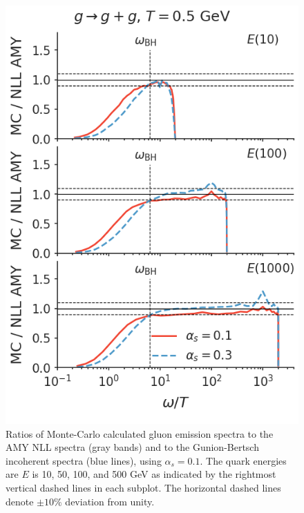 \documentclass[aps, prc, reprint, amsmath, groupedaddress, nofootinbib]{revtex4-1}
\begin{document}
\begin{appendices}
\begin{figure}
\includegraphics[width=\columnwidth]{spectrum_E_g2gg.png}
\caption{Ratios of Monte-Carlo calculated gluon emission spectra to the AMY NLL spectra (gray bands) and to the Gunion-Bertsch incoherent spectra (blue lines), using $\alpha_s = 0.1$. The quark energies are $E$ is 10, 50, 100, and 500 GeV as indicated by the rightmost vertical dashed lines in each subplot. The horizontal dashed lines denote $\pm 10\%$ deviation from unity.}
\label{fig:spectra-alphas=0.1}
\end{figure}


\end{appendices}
\end{document}
